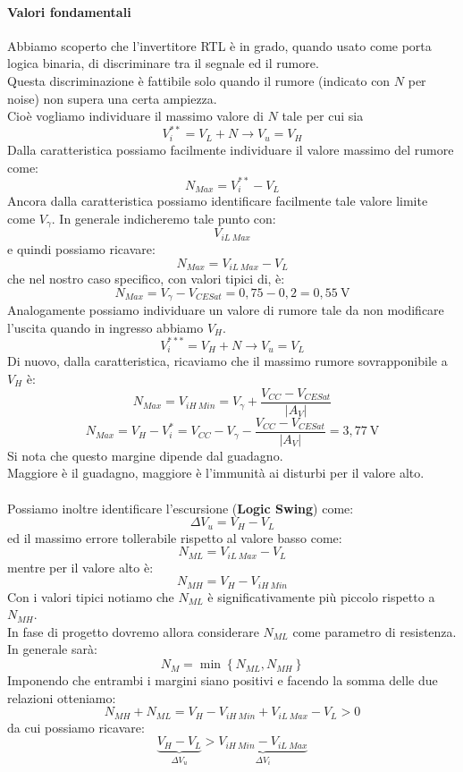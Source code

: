 \documentclass{article}
\numberwithin{equation}{subsection}
\begin{document}
	\paragraph{Valori fondamentali}
	Abbiamo scoperto che l’invertitore RTL è in grado, quando usato come porta logica binaria, di discriminare tra il segnale ed il rumore. \\
	Questa discriminazione è fattibile solo quando il rumore (indicato con $N$ per noise) non supera una certa ampiezza. \\
	Cioè vogliamo individuare il massimo valore di $N$ tale per cui sia
	$$V_i^{**} = V_L + N \longrightarrow V_u = V_H$$
	Dalla caratteristica possiamo facilmente individuare il valore massimo del rumore come:
	$$N_{Max} = V_i^{**} - V_L$$
	Ancora dalla caratteristica possiamo identificare facilmente tale valore limite come $V_\gamma$. In generale indicheremo tale punto con:
	$$V_{iL \ Max}$$
	e quindi possiamo ricavare:
	$$N_{Max} = V_{iL \ Max} - V_L$$
	che nel nostro caso specifico, con valori tipici di, è:
	$$N_{Max} = V_\gamma - V_{CESat} = 0,75 - 0,2 = 0,55\ \text{V}$$
	Analogamente possiamo individuare un valore di rumore tale da non modificare l’uscita quando in ingresso abbiamo $V_H$.
	$$V_i^{***} = V_H + N \longrightarrow V_u = V_L$$
	Di nuovo, dalla caratteristica, ricaviamo che il massimo rumore sovrapponibile a $V_H$ è:
	$$N_{Max} = V_{iH \ Min} = V_\gamma + \frac{V_{CC} - V_{CESat}}{|A_V|}$$
	$$N_{Max} = V_H - V_i^* = V_{CC} - V_\gamma - \frac{V_{CC} - V_{CESat}}{|A_V|} = 3,77\ \text{V}$$
	Si nota che questo margine dipende dal guadagno. \\
	Maggiore è il guadagno, maggiore è l’immunità ai disturbi per il valore alto.\\\\
	Possiamo inoltre identificare l’escursione (\textbf{Logic Swing}) come:
	$$\Delta V_u = V_H - V_L$$
	ed il massimo errore tollerabile rispetto al valore basso come:
	$$N_{ML} = V_{iL \ Max} - V_L$$
	mentre per il valore alto è:
	$$N_{MH} = V_H - V_{iH \ Min}$$
	Con i valori tipici notiamo che $N_{ML}$ è significativamente più piccolo rispetto a $N_{MH}$. \\
	In fase di progetto dovremo allora considerare $N_{ML}$ come parametro di resistenza. In generale sarà:
	$$N_M = \min \left\{N_{ML}, N_{MH}\right\}$$
	Imponendo che entrambi i margini siano positivi e facendo la somma delle due relazioni otteniamo:
	$$N_{MH} + N_{ML} = V_H - V_{iH \ Min} + V_{iL \ Max} - V_L > 0$$
	da cui possiamo ricavare:
	$$\underbrace{V_H - V_L}_{\Delta V_u} > \underbrace{V_{iH \ Min} - V_{iL \ Max}}_{\Delta V_i}$$
\end{document}
